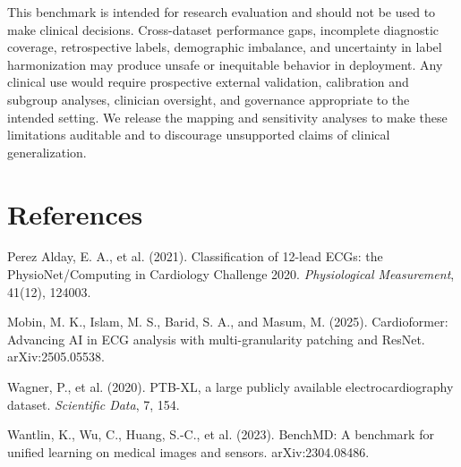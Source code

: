 \documentclass{article}
\begin{document}
This benchmark is intended for research evaluation and should not be used to make clinical decisions. Cross-dataset performance gaps, incomplete diagnostic coverage, retrospective labels, demographic imbalance, and uncertainty in label harmonization may produce unsafe or inequitable behavior in deployment. Any clinical use would require prospective external validation, calibration and subgroup analyses, clinician oversight, and governance appropriate to the intended setting. We release the mapping and sensitivity analyses to make these limitations auditable and to discourage unsupported claims of clinical generalization.

\section*{References}

\small

Perez Alday, E. A., et al. (2021). Classification of 12-lead ECGs: the PhysioNet/Computing in Cardiology Challenge 2020. \emph{Physiological Measurement}, 41(12), 124003.

Mobin, M. K., Islam, M. S., Barid, S. A., and Masum, M. (2025). Cardioformer: Advancing AI in ECG analysis with multi-granularity patching and ResNet. arXiv:2505.05538.

Wagner, P., et al. (2020). PTB-XL, a large publicly available electrocardiography dataset. \emph{Scientific Data}, 7, 154.

Wantlin, K., Wu, C., Huang, S.-C., et al. (2023). BenchMD: A benchmark for unified learning on medical images and sensors. arXiv:2304.08486.

\end{document}
